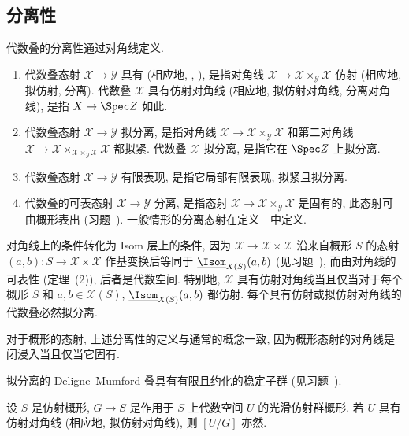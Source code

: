 \subsection{分离性}\label{src:4.3.3-subsection}
代数叠的分离性通过对角线定义.
\begin{definition}\label{src:4.3.11}
\begin{enumerate}[(1)]
\item 代数叠态射 $\mathcal X\to\mathcal Y$ 具有 (相应地, , ), 是指对角线 $\mathcal X\to\mathcal X\times_{\mathcal Y}\mathcal X$ 仿射 (相应地, 拟仿射, 分离). 代数叠 $\mathcal X$ 具有仿射对角线 (相应地, 拟仿射对角线, 分离对角线), 是指 $\mathcal X\to\Spec\mathbb Z$ 如此.
\item 代数叠态射 $\mathcal X\to\mathcal Y$ 拟分离, 是指对角线 $\mathcal X\to\mathcal X\times_{\mathcal Y}\mathcal X$ 和第二对角线 $\mathcal X\to\mathcal X\times_{\mathcal X\times_{\mathcal Y}\mathcal X}\mathcal X$ 都拟紧. 代数叠 $\mathcal X$ 拟分离, 是指它在 $\Spec\mathbb Z$ 上拟分离.
\item 代数叠态射 $\mathcal X\to\mathcal Y$ 有限表现, 是指它局部有限表现, 拟紧且拟分离.
\item 代数叠的可表态射 $\mathcal X\to\mathcal Y$ 分离, 是指态射 $\mathcal X\to\mathcal X\times_{\mathcal Y}\mathcal X$ 是固有的, 此态射可由概形表出 (习题~). 一般情形的分离态射在定义~~中定义.
\end{enumerate}
\end{definition}
对角线上的条件转化为 Isom 层上的条件, 因为 $\mathcal X\to\mathcal X\times\mathcal X$ 沿来自概形 $S$ 的态射 $(a,b):S\to\mathcal X\times\mathcal X$ 作基变换后等同于 $\underline{\Isom}_{\mathcal X(S)}(a,b)$ (见习题~), 而由对角线的可表性 (定理~(2)), 后者是代数空间. 特别地, $\mathcal X$ 具有仿射对角线当且仅当对于每个概形 $S$ 和 $a,b\in\mathcal X(S)$, $\underline{\Isom}_{\mathcal X(S)}(a,b)$ 都仿射. 每个具有仿射或拟仿射对角线的代数叠必然拟分离.
\begin{remark}\label{src:4.3.12}
对于概形的态射, 上述分离性的定义与通常的概念一致, 因为概形态射的对角线是闭浸入当且仅当它固有.
\end{remark}
\begin{remark}\label{src:4.3.13}
拟分离的 Deligne--Mumford 叠具有有限且约化的稳定子群 (见习题~).
\end{remark}
\begin{lemma}\label{src:4.3.14}
设 $S$ 是仿射概形, $G\to S$ 是作用于 $S$ 上代数空间 $U$ 的光滑仿射群概形. 若 $U$ 具有仿射对角线 (相应地, 拟仿射对角线), 则 $[U/G]$ 亦然.
\end{lemma}
